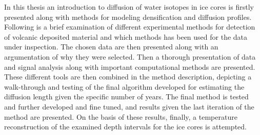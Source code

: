 \documentclass[../../CompleteThesis2/Complete_2ndDraft]{subfiles}
\begin{document}
In this thesis an introduction to diffusion of water isotopes in ice cores is firstly presented along with methods for modeling densification and diffusion profiles. Following is a brief examination of different experimental methods for detection of volcanic deposited material and which methods has been used for the data under inspection. The chosen data are then presented along with an argumentation of why they were selected. Then a thorough presentation of data and signal analysis along with important computational methods are presented. These different tools are then combined in the method description, depicting a walk-through and testing of the final algorithm developed for estimating the diffusion length given the specific number of years. The final method is tested and further developed and fine tuned, and results given the last iteration of the method are presented. On the basis of these results, finally, a temperature reconstruction of the examined depth intervals for the ice cores is attempted. 
	
\end{document}
